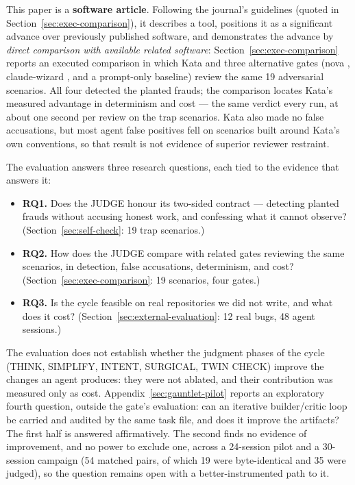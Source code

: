\documentclass{sbc2019}%
\begin{document}
This paper is a \textbf{software article}. Following the journal's
guidelines (quoted in Section~\ref{sec:exec-comparison}), it describes a
tool, positions it as a significant advance over
previously published software, and demonstrates the advance by \emph{direct
comparison with available related software}: Section~\ref{sec:exec-comparison}
reports an executed comparison in which Kata and three alternative gates
(nova \cite{nova}, claude-wizard \cite{claudewizard}, and a prompt-only
baseline) review the same 19 adversarial scenarios. All four detected the
planted frauds; the comparison locates Kata's measured advantage in
determinism and cost --- the same verdict every run, at about one second per
review on the trap scenarios. Kata also made no false accusations, but most agent false positives
fell on scenarios built around Kata's own conventions, so that result is not
evidence of superior reviewer restraint.

The evaluation answers three research questions, each tied to the evidence
that answers it:
\begin{itemize}
\item \textbf{RQ1.} Does the JUDGE honour its two-sided contract ---
detecting planted frauds without accusing honest work, and confessing what
it cannot observe? (Section~\ref{sec:self-check}: 19 trap scenarios.)
\item \textbf{RQ2.} How does the JUDGE compare with related gates reviewing
the same scenarios, in detection, false accusations, determinism, and cost?
(Section~\ref{sec:exec-comparison}: 19 scenarios, four gates.)
\item \textbf{RQ3.} Is the cycle feasible on real repositories we did
not write, and what does it cost? (Section~\ref{sec:external-evaluation}: 12
real bugs, 48 agent sessions.)
\end{itemize}
The evaluation does not establish whether the judgment phases of the cycle
(THINK, SIMPLIFY, INTENT, SURGICAL, TWIN CHECK) improve the changes an agent
produces: they were not ablated, and their contribution was measured only as
cost. Appendix~\ref{sec:gauntlet-pilot} reports an exploratory fourth
question, outside the gate's evaluation: can an iterative builder/critic loop
be carried and audited by the same task file, and does it improve the
artifacts? The first half is answered affirmatively. The second finds no
evidence of improvement, and no power to exclude one, across a 24-session pilot
and a 30-session campaign (54 matched pairs, of which 19 were byte-identical
and 35 were judged), so the question remains open with a better-instrumented
path to it.
\end{document}
